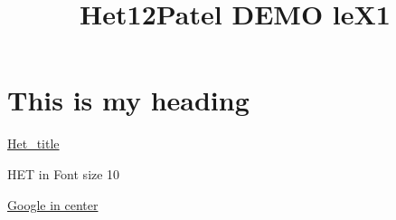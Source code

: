\documentclass{article}
\title{Het12Patel DEMO leX1}
\begin{document}
\maketitle
\section{This is my heading}
\href{http://www.het.com}{Het\_title}
\par
{\fontsize{11}{13}\selectfont HET in Font size 10}
\newline
\newline
\centerline{\href{http://www.google.com}{Google in center}}
\end{document}
